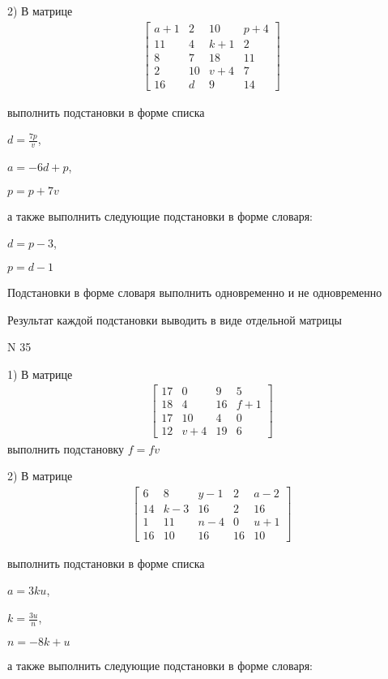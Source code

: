 \documentclass[11pt]{report}
\begin{document}
    2) В матрице
\begin{align*}
\left[\begin{matrix}a + 1 & 2 & 10 & p + 4\\11 & 4 & k + 1 & 2\\8 & 7 & 18 & 11\\2 & 10 & v + 4 & 7\\16 & d & 9 & 14\end{matrix}\right]
\end{align*}

выполнить подстановки в форме списка

$d=\frac{7 p}{v}$,

$a=- 6 d + p$,

$p=p + 7 v$

а также выполнить следующие подстановки в форме словаря:

$d=p - 3$,

$p=d - 1$


    Подстановки в форме словаря выполнить одновременно и не одновременно


    Результат каждой подстановки выводить в виде отдельной матрицы

\newpage
N 35


    1) В матрице
\begin{align*}
\left[\begin{matrix}17 & 0 & 9 & 5\\18 & 4 & 16 & f + 1\\17 & 10 & 4 & 0\\12 & v + 4 & 19 & 6\end{matrix}\right]
\end{align*}
выполнить подстановку $f=f v$


    2) В матрице
\begin{align*}
\left[\begin{matrix}6 & 8 & y - 1 & 2 & a - 2\\14 & k - 3 & 16 & 2 & 16\\1 & 11 & n - 4 & 0 & u + 1\\16 & 10 & 16 & 16 & 10\end{matrix}\right]
\end{align*}

выполнить подстановки в форме списка

$a=3 k u$,

$k=\frac{3 u}{n}$,

$n=- 8 k + u$

а также выполнить следующие подстановки в форме словаря:
\end{document}

